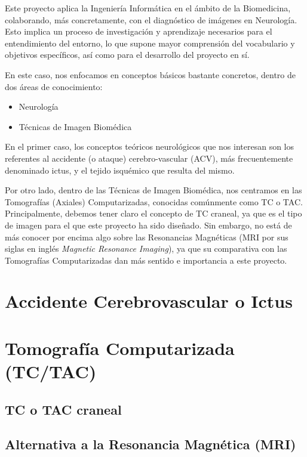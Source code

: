 
Este proyecto aplica la Ingeniería Informática en el ámbito de la Biomedicina, colaborando, más concretamente, con el diagnóstico de imágenes en Neurología. Esto implica un proceso de investigación y aprendizaje necesarios para el entendimiento del entorno, lo que supone mayor comprensión del vocabulario y objetivos específicos, así como para el desarrollo del proyecto en sí.

En este caso, nos enfocamos en conceptos básicos bastante concretos, dentro de dos áreas de conocimiento:
\begin{itemize}
	\item Neurología
	\item Técnicas de Imagen Biomédica
\end{itemize}

En el primer caso, los conceptos teóricos neurológicos que nos interesan son los referentes al accidente (o ataque) cerebro-vascular (ACV), más frecuentemente denominado ictus, y el tejido isquémico que resulta del mismo.

Por otro lado, dentro de las Técnicas de Imagen Biomédica, nos centramos en las Tomografías (Axiales) Computarizadas, conocidas comúnmente como TC o TAC. Principalmente, debemos tener claro el concepto de TC craneal, ya que es el tipo de imagen para el que este proyecto ha sido diseñado. Sin embargo, no está de más conocer por encima algo sobre las Resonancias Magnéticas (MRI por sus siglas en inglés \textit{Magnetic Resonance Imaging}), ya que su comparativa con las Tomografías Computarizadas dan más sentido e importancia a este proyecto.


\section{Accidente Cerebrovascular o Ictus}




\section{Tomografía Computarizada (TC/TAC)}




\subsection{TC o TAC craneal}




\subsection{Alternativa a la Resonancia Magnética (MRI)}





